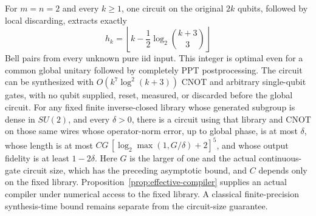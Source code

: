 \begin{proposition}\label{prop:pure-circuit}
For $m=n=2$ and every $k\ge1$, one circuit on the original $2k$ qubits, followed by local discarding, extracts exactly
\[
 h_k=\left\lfloor k-\frac12\log_2\binom{k+3}{3}\right\rfloor
\]
Bell pairs from every unknown pure iid input. This integer is optimal even for a common global unitary followed by completely PPT postprocessing. The circuit can be synthesized with $O(k^7\log^2(k+3))$ CNOT and arbitrary single-qubit gates, with no qubit supplied, reset, measured, or discarded before the global circuit. For any fixed finite inverse-closed library whose generated subgroup is dense in $SU(2)$, and every $\delta>0$, there is a circuit using that library and CNOT on those same wires whose operator-norm error, up to global phase, is at most $\delta$, whose length is at most $C G\,[\log_2\max(1,G/\delta)+2]^5$, and whose output fidelity is at least $1-2\delta$. Here $G$ is the larger of one and the actual continuous-gate circuit size, which has the preceding asymptotic bound, and $C$ depends only on the fixed library. Proposition~\ref{prop:effective-compiler} supplies an actual compiler under numerical access to the fixed library. A classical finite-precision synthesis-time bound remains separate from the circuit-size guarantee.
\end{proposition}
